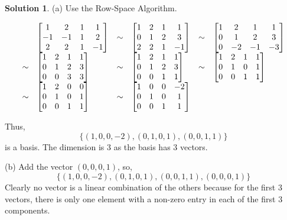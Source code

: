 \documentclass{article}
\theoremstyle{definition}
\newtheorem*{solution}{Solution}
\begin{document}
\begin{solution}

(a) Use the Row-Space Algorithm.

\[
\begin{array}{r l r l r l}
& \begin{bmatrix}
1 & 2 & 1 & 1 \\
-1 & -1 & 1 & 2 \\
2 & 2 & 1 & -1
\end{bmatrix}
& \sim & \begin{bmatrix}
1 & 2 & 1 & 1 \\
0 & 1 & 2 & 3 \\
2 & 2 & 1 & -1
\end{bmatrix}
& \sim & \begin{bmatrix}
1 & 2 & 1 & 1 \\
0 & 1 & 2 & 3 \\
0 & -2 & -1 & -3
\end{bmatrix} \\
\sim & \begin{bmatrix}
1 & 2 & 1 & 1 \\
0 & 1 & 2 & 3 \\
0 & 0 & 3 & 3
\end{bmatrix}
& \sim & \begin{bmatrix}
1 & 2 & 1 & 1 \\
0 & 1 & 2 & 3 \\
0 & 0 & 1 & 1
\end{bmatrix}
& \sim & \begin{bmatrix}
1 & 2 & 1 & 1 \\
0 & 1 & 0 & 1 \\
0 & 0 & 1 & 1
\end{bmatrix} \\
\sim & \begin{bmatrix}
1 & 2 & 0 & 0 \\
0 & 1 & 0 & 1 \\
0 & 0 & 1 & 1
\end{bmatrix}
& \sim & \begin{bmatrix}
1 & 0 & 0 & -2 \\
0 & 1 & 0 & 1 \\
0 & 0 & 1 & 1
\end{bmatrix}
\end{array}
\]

Thus,
\[\{(1,0,0,-2),(0,1,0,1),(0,0,1,1)\}\]
is a basis.
The dimension is $3$ as the basis has $3$ vectors.

(b) Add the vector $(0,0,0,1)$, so,
\[\{(1,0,0,-2),(0,1,0,1),(0,0,1,1),(0,0,0,1)\}\]
Clearly no vector is a linear combination of the others because for the first 3 vectors, there is only one element with a non-zero entry in each of the first $3$ components.

\end{solution}
\end{document}
